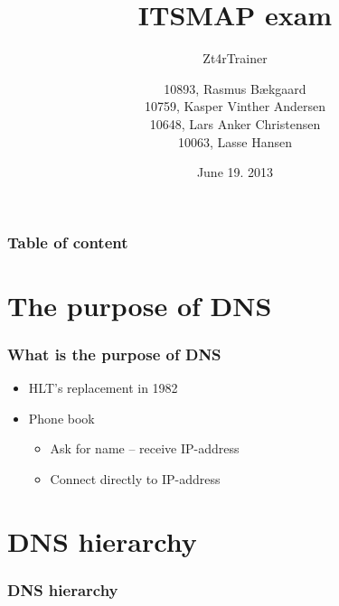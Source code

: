 \documentclass{beamer}
\title{ITSMAP exam}
\subtitle{Zt4rTrainer}
\author %
{10893, Rasmus Bækgaard\inst{1}\\
10759, Kasper Vinther Andersen\inst{1}\\
10648, Lars Anker Christensen\inst{1}\\
10063, Lasse Hansen\inst{1}}
\institute%
{
  \inst{1}%
  Information and Communication Technology\\
  Aarhus University, School of Engineering
}
\date{June 19. 2013}
\begin{document}
\frame{\titlepage}
	
\begin{frame}
	\frametitle{Table of content}
	\tableofcontents%
\end{frame}


\section{The purpose of DNS}
\begin{frame}
	\frametitle{What is the purpose of DNS}
	
	\begin{itemize}
	\item HLT's replacement in 1982
	\item Phone book
	
		\begin{itemize}
		\item Ask for name -- receive IP-address
		\item Connect directly to IP-address
		\end{itemize}
	
	\end{itemize}
	
\end{frame}
	
\section{DNS hierarchy}
\begin{frame}
	\frametitle{DNS hierarchy}
	
	
\end{frame}
	
 
\end{document}
